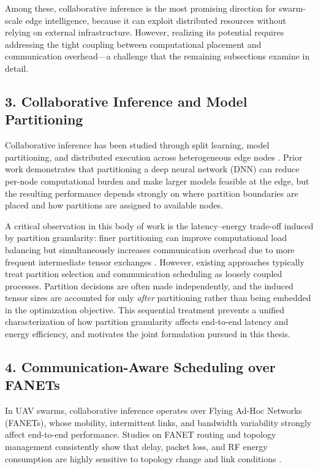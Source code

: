 Among these, collaborative inference is the most promising direction for swarm-scale edge intelligence, because it can exploit distributed resources without relying on external infrastructure. However, realizing its potential requires addressing the tight coupling between computational placement and communication overhead---a challenge that the remaining subsections examine in detail.

\subsection*{3. Collaborative Inference and Model Partitioning}
Collaborative inference has been studied through split learning, model partitioning, and distributed execution across heterogeneous edge nodes \cite{hu2025splitreview,duan2022combined,li2024fsl,matsubara2022split,lin2024dnnpartition,kang2017neurosurgeon,hu2019dads}. Prior work demonstrates that partitioning a deep neural network (DNN) can reduce per-node computational burden and make larger models feasible at the edge, but the resulting performance depends strongly on where partition boundaries are placed and how partitions are assigned to available nodes.

A critical observation in this body of work is the latency--energy trade-off induced by partition granularity: finer partitioning can improve computational load balancing but simultaneously increases communication overhead due to more frequent intermediate tensor exchanges \cite{qu2024elastic,hu2025splitreview,kang2017neurosurgeon,laskaridis2020spinn}. However, existing approaches typically treat partition selection and communication scheduling as loosely coupled processes. Partition decisions are often made independently, and the induced tensor sizes are accounted for only \emph{after} partitioning rather than being embedded in the optimization objective. This sequential treatment prevents a unified characterization of how partition granularity affects end-to-end latency and energy efficiency, and motivates the joint formulation pursued in this thesis.

\subsection*{4. Communication-Aware Scheduling over FANETs}
In UAV swarms, collaborative inference operates over Flying Ad-Hoc Networks (FANETs), whose mobility, intermittent links, and bandwidth variability strongly affect end-to-end performance. Studies on FANET routing and topology management consistently show that delay, packet loss, and RF energy consumption are highly sensitive to topology change and link conditions \cite{amponis2021fanet,lansky2023firefly,hosseinzadeh2024local,blanquer2024resilient,shao2022task}.

